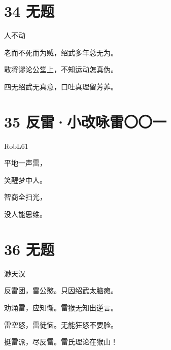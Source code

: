 \documentclass[UTF8,12pt,oneside]{ctexbook}
\begin{document}
        \newpage
        
        \section{34 无题}
        \begin{center}
            人不动
        \end{center}
        
        \begin{center}
            老而不死而为贼，绍武多年总无为。
            
            敢将谬论公堂上，不知运动怎真伪。
            
            四无绍武无真意，口吐真理留芳菲。
        \end{center}
        
        \section{35 反雷·小改咏雷〇〇一}
        \begin{center}
            RobL61
        \end{center}
        
        \begin{center}
            平地一声雷，
            
            笑醒梦中人。
            
            智商全扫光，
            
            没人能思维。
        \end{center}
        
        \section{36 无题}
        \begin{center}
            渺天汉
        \end{center}
        
        \begin{center}
            反雷团，雷公憨。只因绍武太脑瘫。
            
            劝涌雷，应知惭。雷猴无知出逆言。
            
            雷空怒，雷徒恼。无能狂怒不要脸。
            
            挺雷派，尽反雷。雷氏理论在猴山！
        \end{center}
        
        \newpage
        
\end{document}
